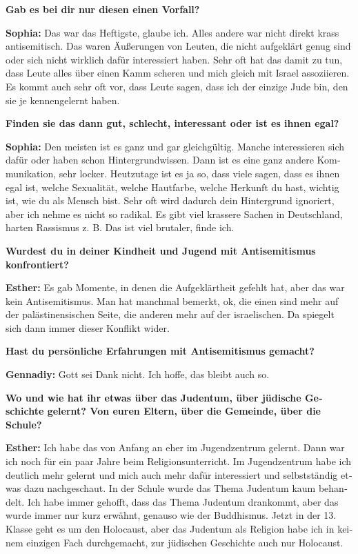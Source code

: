 \begin{otherlanguage}{ngerman}
\textbf{Gab es bei dir nur diesen einen Vorfall?} 

\textbf{Sophia:} Das war das Heftigste, glaube ich. Alles andere war nicht direkt krass antisemitisch. Das waren Äußerungen von Leuten, die nicht aufgeklärt genug sind oder sich nicht wirklich dafür interessiert haben. Sehr oft hat das damit zu tun, dass Leute alles über einen Kamm scheren und mich gleich mit Israel assoziieren. Es kommt auch sehr oft vor, dass Leute sagen, dass ich der einzige Jude bin, den sie je kennengelernt haben. 

\textbf{Finden sie das dann gut, schlecht, interessant oder ist es ihnen egal?} 

\textbf{Sophia:} Den meisten ist es ganz und gar gleichgültig. Manche interessieren sich dafür oder haben schon Hintergrundwissen. Dann ist es eine ganz andere Kommunikation, sehr locker. Heutzutage ist es ja so, dass viele sagen, dass es ihnen egal ist, welche Sexualität, welche Hautfarbe, welche Herkunft du hast, wichtig ist, wie du als Mensch bist. Sehr oft wird dadurch dein Hintergrund ignoriert, aber ich nehme es nicht so radikal. Es gibt viel krassere Sachen in Deutschland, harten Rassismus z. B. Das ist viel brutaler, finde ich.  

\textbf{Wurdest du in deiner Kindheit und Jugend mit Antisemitismus konfrontiert?} 

\textbf{Esther:} Es gab Momente, in denen die Aufgeklärtheit gefehlt hat, aber das war kein Antisemitismus. Man hat manchmal bemerkt, ok, die einen sind mehr auf der palästinensischen Seite, die anderen mehr auf der israelischen. Da spiegelt sich dann immer dieser Konflikt wider.  

\textbf{Hast du persönliche Erfahrungen mit Antisemitismus gemacht?} 

\textbf{Gennadiy:} Gott sei Dank nicht. Ich hoffe, das bleibt auch so.  

\textbf{Wo und wie hat ihr etwas über das Judentum, über jüdische Geschichte gelernt? Von euren Eltern, über die Gemeinde, über die Schule?} 

\textbf{Esther:} Ich habe das von Anfang an eher im Jugendzentrum gelernt. Dann war ich noch für ein paar Jahre beim Religionsunterricht. Im Jugendzentrum habe ich deutlich mehr gelernt und mich auch mehr dafür interessiert und selbstständig etwas dazu nachgeschaut. In der Schule wurde das Thema Judentum kaum behandelt. Ich habe immer gehofft, dass das Thema Judentum drankommt, aber das wurde immer nur kurz erwähnt, genauso wie der Buddhismus. Jetzt in der 13. Klasse geht es um den Holocaust, aber das Judentum als Religion habe ich in keinem einzigen Fach durchgemacht, zur jüdischen Geschichte auch nur Holocaust. 


\end{otherlanguage}
